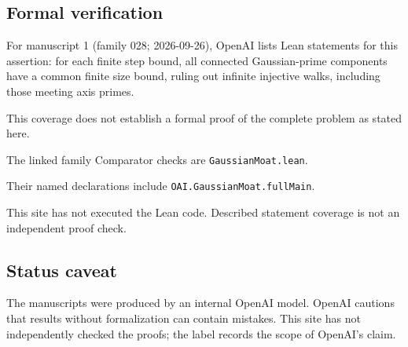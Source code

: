 \documentclass[11pt]{article}
\begin{document}
\subsection{Formal verification}
For manuscript 1 (family 028; 2026-09-26), OpenAI lists Lean statements for this assertion: for each finite step bound, all connected Gaussian-prime components have a common finite size bound, ruling out infinite injective walks, including those meeting axis primes.

This coverage does not establish a formal proof of the complete problem as stated here.

The linked family Comparator checks are \texttt{GaussianMoat.lean}.

Their named declarations include \texttt{OAI.GaussianMoat.fullMain}.

This site has not executed the Lean code. Described statement coverage is not an independent proof check.

\subsection{Status caveat}
The manuscripts were produced by an internal OpenAI model. OpenAI cautions that results without formalization can contain mistakes. This site has not independently checked the proofs; the label records the scope of OpenAI's claim.
\end{document}
